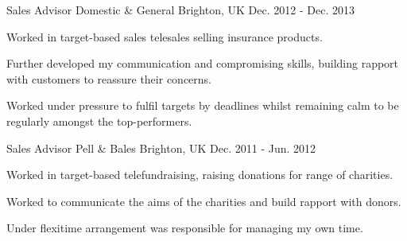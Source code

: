 \begin{cventries}
  \cventry
    {Sales Advisor}
    {Domestic \& General}
    {Brighton, UK}
    {Dec. 2012 - Dec. 2013}
    {
      \begin{cvitems}
        \item {Worked in target-based sales telesales selling insurance products.}
        \item{Further developed my communication and compromising skills, building rapport with customers to reassure their concerns.}
        \item {Worked under pressure to fulfil targets by deadlines whilst remaining calm to be regularly amongst the top-performers.}
      \end{cvitems}
    }
  \cventry
    {Sales Advisor}
    {Pell \& Bales}
    {Brighton, UK}
    {Dec. 2011 - Jun. 2012}
    {
      \begin{cvitems}
        \item {Worked in target-based  telefundraising, raising donations for range of charities.}
        \item{Worked to communicate the aims of the charities and build rapport with donors.}
        \item {Under flexitime arrangement was responsible for managing my own time.}
      \end{cvitems}
    }
\end{cventries}

